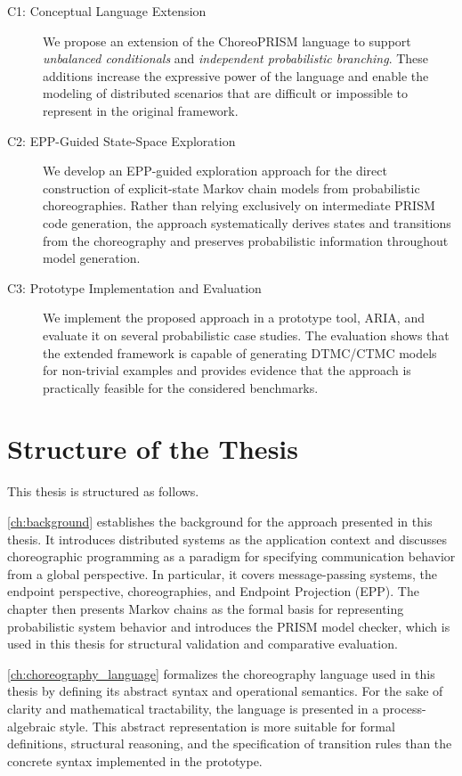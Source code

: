 \begin{description}
	\item[C1: Conceptual Language Extension]
	We propose an extension of the ChoreoPRISM language to support \emph{unbalanced conditionals} and \emph{independent probabilistic branching}. These additions increase the expressive power of the language and enable the modeling of distributed scenarios that are difficult or impossible to represent in the original framework.
	
	\item[C2: EPP-Guided State-Space Exploration]
	We develop an EPP-guided exploration approach for the direct construction of explicit-state Markov chain models from probabilistic choreographies. Rather than relying exclusively on intermediate PRISM code generation, the approach systematically derives states and transitions from the choreography and preserves probabilistic information throughout model generation.
	
	\item[C3: Prototype Implementation and Evaluation]
	We implement the proposed approach in a prototype tool, \textsc{ARIA}, and evaluate it on several probabilistic case studies. The evaluation shows that the extended framework is capable of generating DTMC/CTMC models for non-trivial examples and provides evidence that the approach is practically feasible for the considered benchmarks.
\end{description}



\section{Structure of the Thesis}
This thesis is structured as follows.
 
\cref{ch:background} establishes the background for the approach presented in this thesis. It introduces distributed systems as the application context and discusses choreographic programming as a paradigm for specifying communication behavior from a global perspective. In particular, it covers message-passing systems, the endpoint perspective, choreographies, and Endpoint Projection (EPP). The chapter then presents Markov chains as the formal basis for representing probabilistic system behavior and introduces the PRISM model checker, which is used in this thesis for structural validation and comparative evaluation.

\cref{ch:choreography_language} formalizes the choreography language used in this thesis by defining its abstract syntax and operational semantics. For the sake of clarity and mathematical tractability, the language is presented in a process-algebraic style. This abstract representation is more suitable for formal definitions, structural reasoning, and the specification of transition rules than the concrete syntax implemented in the prototype.

